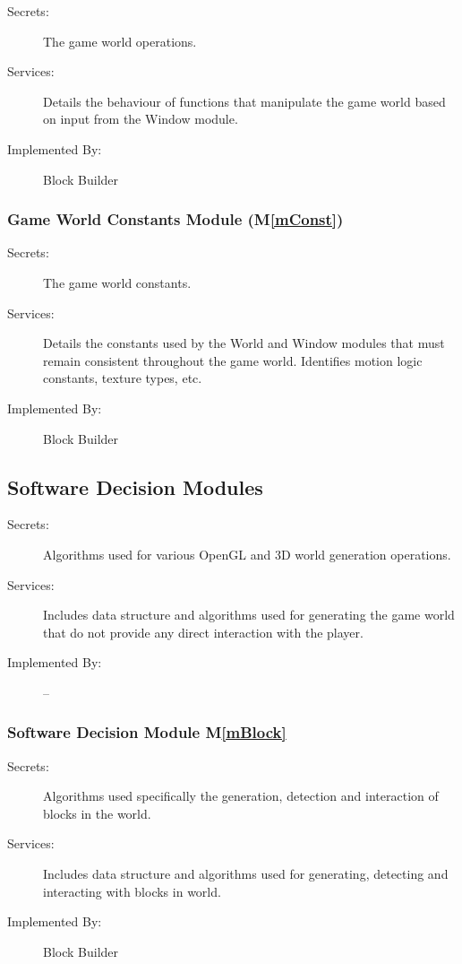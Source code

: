 \documentclass[12pt, titlepage]{article}
\newcommand{\mref}[1]{M\ref{#1}}
\begin{document}
\begin{description}
\item[Secrets:]The game world operations.
\item[Services:]Details the behaviour of functions that manipulate the game world based on input from the Window module.
\item[Implemented By:] Block Builder
\end{description}

\subsubsection{Game World Constants Module (\mref{mConst})}

\begin{description}
\item[Secrets:]The game world constants.
\item[Services:]Details the constants used by the World and Window modules that must remain consistent throughout the game world. Identifies motion logic constants, texture types, etc.
\item[Implemented By:] Block Builder
\end{description}

\subsection{Software Decision Modules}

\begin{description}
\item[Secrets:] Algorithms used for various OpenGL and 3D world generation operations.
\item[Services:] Includes data structure and algorithms used for generating the game world that do not provide any direct interaction with the player.
\item[Implemented By:] --
\end{description}

\subsubsection{Software Decision Module \mref{mBlock}}

\begin{description}
\item[Secrets:] Algorithms used specifically the generation, detection and interaction of blocks in the world.
\item[Services:] Includes data structure and algorithms used for generating, detecting and interacting with blocks in world.
\item[Implemented By:] Block Builder
\end{description}
\end{document}
